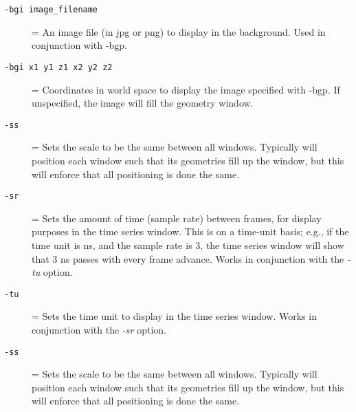 \begin{description}

      \item[{\tt -bgi image\_filename}] = An image file (in jpg or png) to
        display in the background.  Used in conjunction with -bgp.
      \item[{\tt -bgi x1 y1 z1 x2 y2 z2}] = Coordinates in world space to display
        the image specified with -bgp.  If unspecified, the image will fill the
        geometry window.
      \item[{\tt -ss}] = Sets the scale to be the same between all windows.
        Typically \map{} will position each window such that its geometries
        fill up the window, but this will enforce that all positioning is
        done the same.
      \item[{\tt -sr}] = Sets the amount of time (sample rate) between
        frames, for display purposes in the time series window.  This is on
        a time-unit basis; e.g., if the time unit is ns, and the sample
        rate is 3, the time series window will show that 3 ns passes with
        every frame advance.  Works in conjunction with the \emph{-tu}
        option.
      \item[{\tt -tu}] = Sets the time unit to display in the time series
        window.  Works in conjunction with the \emph{-sr} option.
      \item[{\tt -ss}] = Sets the scale to be the same between all windows.
        Typically \map{} will position each window such that its geometries
        fill up the window, but this will enforce that all positioning is
        done the same.


\end{description}
        
